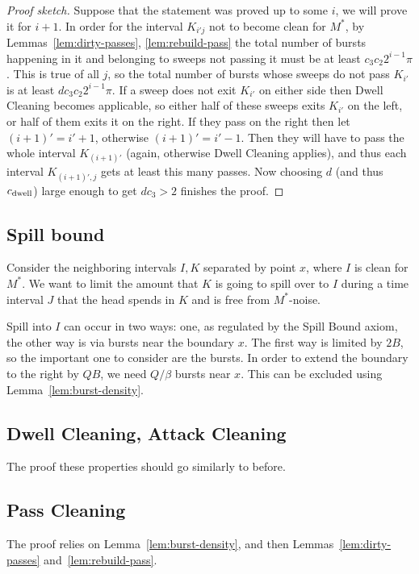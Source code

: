 \documentclass[12pt]{memoir}
\def\B{B}
\newcommand{\Q}{Q}
\newcommand{\Cns}[2]{#1_{\textrm{\upshape #2}}}
\newcommand{\cns}[1]{\Cns{c}{#1}}
\newcommand{\cDwell}{\cns{dwell}}
\begin{document}
\begin{proof}[Proof sketch]
Suppose that the statement was proved up to some \( i \), we will prove it for \( i+1 \).
In order for the interval \( K_{i'j} \) not to become clean for \( M^{*} \), 
by Lemmas~\ref{lem:dirty-passes}, \ref{lem:rebuild-pass}
the total number of bursts happening in it and belonging to sweeps not 
passing it must be at least \( c_{3}c_{2} 2^{i-1}\pi \).
This is true of all \( j \), so the total number of bursts whose sweeps do not pass \( K_{i'} \)
is at least \( d c_{3}c_{2} 2^{i-1}\pi \).
If a sweep does not exit \( K_{i'} \) on either side then Dwell Cleaning becomes applicable,
so either half of these sweeps exits \( K_{i'} \) on the left, or half of them exits it on the right.
If they pass on the right then let \( (i+1)'=i'+1 \), otherwise \( (i+1)'=i'-1 \).
Then they will have to pass the whole interval \( K_{(i+1)'} \) (again, otherwise Dwell Cleaning
applies), and thus each interval \( K_{(i+1)',j} \) gets at least this many passes.
Now choosing \( d \) (and thus \( \cDwell \)) large enough 
to get \( d c_{3}>2 \) finishes the proof.
\end{proof}


\subsection{Spill bound}

Consider the neighboring intervals \( I,K \) separated by point \( x \),
where \( I \) is clean for \( M^{*} \).
We want to limit the amount that \( K \) is going to spill over to \( I \) during a time
interval \( J \) that the head spends in \( K \) and is free from \( M^{*} \)-noise.

Spill into \( I \) can occur in two ways: one, as regulated by the Spill Bound axiom, 
the other way is via bursts near the boundary \( x \).
The first way is limited by \( 2\B \), so the important one to consider are the bursts.
In order to extend the boundary to the right by \( \Q\B \),
we need \( \Q/\beta \) bursts near \( x \).
This can be excluded using Lemma~\ref{lem:burst-density}.

\subsection{Dwell Cleaning, Attack Cleaning}

The proof these properties should go similarly to before.

\subsection{Pass Cleaning}

The proof relies on Lemma~\ref{lem:burst-density}, and then 
Lemmas~\ref{lem:dirty-passes} and~\ref{lem:rebuild-pass}.
\end{document}
